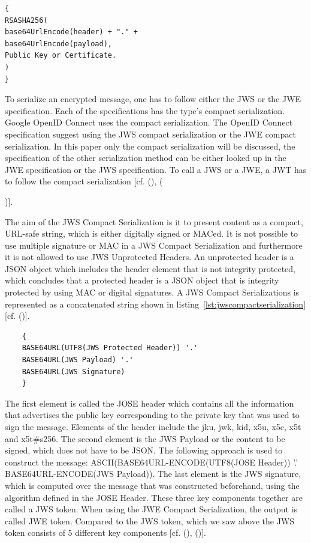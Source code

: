 \begin{lstlisting}
{
RSASHA256(
base64UrlEncode(header) + "." +
base64UrlEncode(payload),
Public Key or Certificate.
)
}
\end{lstlisting}


To serialize an encrypted message, one has to follow either the JWS or the JWE specification. Each of the specifications has the type’s compact serialization. Google OpenID Connect uses the compact serialization. The OpenID Connect specification suggest using the JWS compact serialization or the JWE compact serialization. In this paper only the compact serialization will be discussed, the specification of the other serialization method can be either looked up in the JWE specification or the JWS specification. To call a JWS or a JWE, a JWT has to follow the compact serialization [cf. (\cite{JWS:IETF:Jones:2015}), ({\cite{JWE:IETF:Jones:2015})].
	
	The aim of the JWS Compact Serialization is it to present content as a compact, URL-safe string, which is either digitally signed or MACed. It is not possible to use multiple signature or MAC in a JWS Compact Serialization and furthermore it is not allowed to use JWS Unprotected Headers. An unprotected header is a JSON object which includes the header element that is not integrity protected, which concludes that a protected header is a JSON object that is integrity protected by using MAC or digital signatures. A JWS Compact Serializations is represented as a concatenated string shown in listing~\ref{lst:jwscompactserialization} [cf. (\cite{JWS:IETF:Jones:2015})].
	
	\begin{lstlisting}
	{
	BASE64URL(UTF8(JWS Protected Header)) '.'
	BASE64URL(JWS Payload) '.'
	BASE64URL(JWS Signature)
	}
	\end{lstlisting}
	
	The first element is called the JOSE header which contains all the information that advertises the public key corresponding to the private key that was used to sign the message. Elements of the header include the jku, jwk, kid, x5u, x5c, x5t and x5t\#s256. The second element is the JWS Payload or the content to be signed, which does not have to be JSON. The following approach is used  to construct the message: ASCII(BASE64URL-ENCODE(UTF8(JOSE Header)) '.' BASE64URL-ENCODE(JWS Payload)). 
	The last element is the JWS signature, which is computed over the message that was constructed beforehand, using the algorithm defined in the JOSE Header. These three key components together are called a JWS token. When using the JWE Compact Serialization, the output is called JWE token. Compared to the JWS token, which we saw above the JWS token consists of 5 different key components [cf. (\cite{JWS:IETF:Jones:2015}), (\cite{JWE:IETF:Jones:2015})].
	
}
